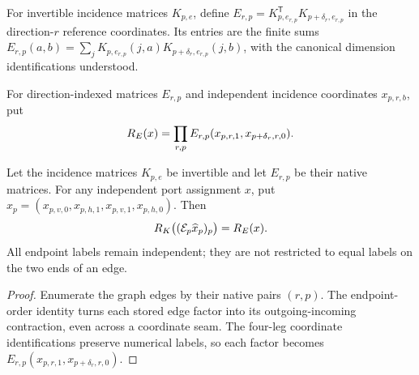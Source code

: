 \begin{definition}%
    \label{def:peps_native_incidence_matrices}
    \leanok
    For invertible incidence matrices $K_{p,e}$, define
    $E_{r,p}=K_{p,e_{r,p}}^{\mathsf T}K_{p+\delta_r,e_{r,p}}$ in the
    direction-$r$ reference coordinates. Its entries are the finite sums
    $E_{r,p}(a,b)=\sum_jK_{p,e_{r,p}}(j,a)
        K_{p+\delta_r,e_{r,p}}(j,b)$, with the canonical dimension
    identifications understood.
\end{definition}

\begin{definition}%
    \label{def:peps_independent_port_product}
    \leanok
    For direction-indexed matrices $E_{r,p}$ and independent incidence
    coordinates $x_{p,r,b}$, put
    \begin{align}
        R_E(x)=\prod_{r,p}E_{r,p}(x_{p,r,1},x_{p+\delta_r,r,0}).\notag
    \end{align}
\end{definition}

\begin{lemma}%
    \label{thm:peps_independent_port_coefficient}
    \leanok
    Let the incidence matrices $K_{p,e}$ be invertible and let $E_{r,p}$
    be their native matrices. For any independent port assignment $x$, put
    $\widehat x_p=(x_{p,v,0},x_{p,h,1},x_{p,v,1},x_{p,h,0})$. Then
    \begin{align}
        R_K\bigl((\mathcal E_p\widehat x_p)_p\bigr)=R_E(x).\notag
    \end{align}
    All endpoint labels remain independent; they are not restricted to
    equal labels on the two ends of an edge.
\end{lemma}
\begin{proof}\leanok
    Enumerate the graph edges by their native pairs $(r,p)$.
    The endpoint-order identity turns each stored edge factor into its
    outgoing-incoming contraction, even across a coordinate seam.
    The four-leg coordinate identifications preserve numerical labels, so
    each factor becomes $E_{r,p}(x_{p,r,1},x_{p+\delta_r,r,0})$.
\end{proof}

